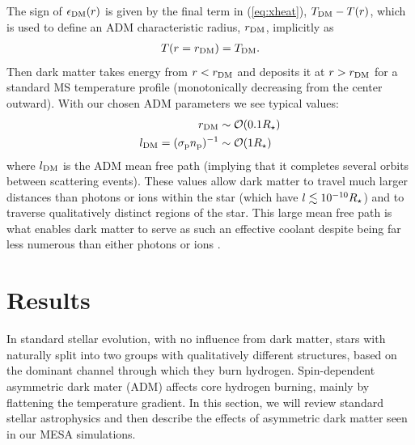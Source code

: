 \documentclass[useAMS,usenatbib]{mnras}
\begin{document}
  The sign of $\epsilon_{\mathrm{DM}}(r)$ is given by the final term in (\ref{eq:xheat}), $T_{\mathrm{DM}} - T(r)$, which is used to define an ADM characteristic radius, $r_{\mathrm{DM}}$, implicitly as
  \begin{align}
    T(r=r_{\mathrm{DM}}) = T_{\mathrm{DM}}.
  \end{align}
  Then dark matter takes energy from $r < r_{\mathrm{DM}}$ and deposits it at $r > r_{\mathrm{DM}}$ for a standard MS temperature profile (monotonically decreasing from the center outward). With our chosen ADM parameters we see typical values:
  \begin{align}
    r_{\mathrm{DM}} & \sim \mathcal{O}(0.1 R_{\star}) \\
    l_{\mathrm{DM}} = (\sigma_{\mathrm{p}} n_{\mathrm{p}})^{-1} & \sim\mathcal{O}(1 R_{\star})
  \end{align}
  where $l_{\mathrm{DM}}$ is the ADM mean free path (implying that it completes several orbits between scattering events). These values allow dark matter to travel much larger distances than photons or ions within the star (which have $l \lesssim 10^{-10} R_{\star}$) and to traverse qualitatively distinct 
  regions of the star. This large mean free path is what enables dark matter 
  to serve as such an effective coolant despite being far less numerous than either photons or ions \citep{Spergel1985EffectInterior}.



\section{Results}
\label{sec:results}

In standard stellar evolution, with no influence from dark matter, stars with \mrange naturally split into two groups with qualitatively different structures, based on the dominant channel through which they burn hydrogen. Spin-dependent asymmetric dark mater (ADM) affects core hydrogen burning, mainly by flattening the temperature gradient. In this section, we will review standard stellar astrophysics \citep{Kippenhahn2012} and then describe the effects of asymmetric dark matter seen in our MESA simulations.
\end{document}

